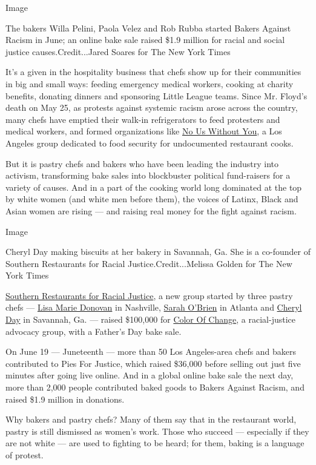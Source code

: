 Image

The bakers Willa Pelini, Paola Velez and Rob Rubba started Bakers
Against Racism in June; an online bake sale raised \$1.9 million for
racial and social justice causes.Credit...Jared Soares for The New York
Times

It's a given in the hospitality business that chefs show up for their
communities in big and small ways: feeding emergency medical workers,
cooking at charity benefits, donating dinners and sponsoring Little
League teams. Since Mr. Floyd's death on May 25, as protests against
systemic racism arose across the country, many chefs have emptied their
walk-in refrigerators to feed protesters and medical workers, and formed
organizations like \href{https://www.nouswithoutyou.la/}{No Us Without
You}, a Los Angeles group dedicated to food security for undocumented
restaurant cooks.

But it is pastry chefs and bakers who have been leading the industry
into activism, transforming bake sales into blockbuster political
fund-raisers for a variety of causes. And in a part of the cooking world
long dominated at the top by white women (and white men before them),
the voices of Latinx, Black and Asian women are rising --- and raising
real money for the fight against racism.

Image

Cheryl Day making biscuits at her bakery in Savannah, Ga. She is a
co-founder of Southern Restaurants for Racial Justice.Credit...Melissa
Golden for The New York Times

\href{https://www.instagram.com/srrj_coalition/?hl=en}{Southern
Restaurants for Racial Justice}, a new group started by three pastry
chefs --- \href{https://www.instagram.com/lisamariedonovan/?hl=en}{Lisa
Marie Donovan} in Nashville,
\href{http://www.littletartatl.com/who-we-are/}{Sarah O'Brien} in
Atlanta and \href{https://www.instagram.com/cherylday/?hl=en}{Cheryl
Day} in Savannah, Ga. --- raised \$100,000 for
\href{https://colorofchange.org/}{Color Of Change}, a racial-justice
advocacy group, with a Father's Day bake sale.

On June 19 --- Juneteenth --- more than 50 Los Angeles-area chefs and
bakers contributed to Pies For Justice, which raised \$36,000 before
selling out just five minutes after going live online. And in a global
online bake sale the next day, more than 2,000 people contributed baked
goods to Bakers Against Racism, and raised \$1.9 million in donations.

Why bakers and pastry chefs? Many of them say that in the restaurant
world, pastry is still dismissed as women's work. Those who succeed ---
especially if they are not white --- are used to fighting to be heard;
for them, baking is a language of protest.

